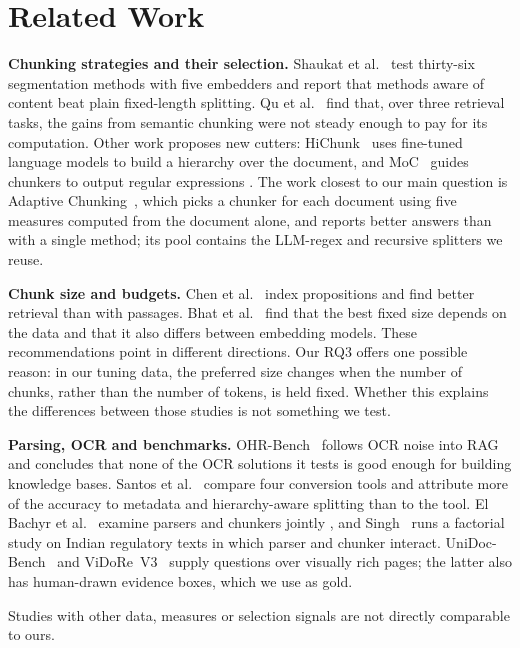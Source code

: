 \section{Related Work}\label{sec:related}

\textbf{Chunking strategies and their selection.} Shaukat et
al.~\cite{shaukat2026systematic} test thirty-six segmentation methods with five
embedders and report that methods aware of content beat plain fixed-length
splitting. Qu et
al.~\cite{qu2025semantic} find that, over three retrieval tasks, the gains from
semantic chunking were not steady enough to pay for its computation. Other work
proposes new cutters: HiChunk~\cite{lu2025hichunk} uses fine-tuned language
models to build a hierarchy over the document, and MoC~\cite{zhao2025moc} guides
chunkers to output regular expressions . The work closest to our main question is Adaptive
Chunking~\cite{demourajunior2026adaptive}, which picks a chunker for each document
using five measures computed from the document alone, and reports better answers
than with a single method; its pool contains the LLM-regex and recursive
splitters we reuse.

\textbf{Chunk size and budgets.} 
Chen et al.~\cite{chen2024densex} index propositions and find better retrieval than with passages. Bhat et
al.~\cite{bhat2025chunksize} find that the best fixed size depends on the data and that
it also differs between embedding models. These recommendations point in different directions. Our RQ3 offers one
possible reason: in our tuning data, the preferred size changes when the number of chunks,
rather than the number of tokens, is held fixed. Whether this explains the
differences between those studies is not something we test. 

\textbf{Parsing, OCR and benchmarks.} OHR-Bench~\cite{zhang2024ocr} follows OCR
noise into RAG and concludes that none of the OCR solutions it tests is good
enough for building knowledge bases. Santos et al.~\cite{santos2026pdf} compare
four conversion tools  and attribute more of
the accuracy to metadata and hierarchy-aware splitting than to the tool. El Bachyr
et al.~\cite{elbachyr2026empirical} examine parsers and chunkers jointly , and Singh~\cite{singh2026parser} runs a factorial study on
Indian regulatory texts in which parser and chunker interact.
UniDoc-Bench~\cite{peng2025unidoc} and ViDoRe~V3~\cite{loison2026vidore} supply
questions over visually rich pages; the latter also has human-drawn evidence
boxes, which we use as gold.

Studies with other data, measures or selection signals are not directly
comparable to ours.

